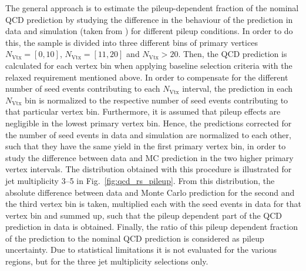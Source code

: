 The general approach is to estimate the pileup-dependent fraction of the nominal QCD prediction by studying the difference in the behaviour of the prediction in data and simulation (taken from \madgraph) for different pileup conditions. In order to do this, the sample is divided into three different bins of primary vertices $N_\mathrm{Vtx} = [0, 10]$, $N_\mathrm{Vtx} = [11, 20]$ and $N_\mathrm{Vtx} > 20$. Then, the QCD prediction is calculated for each vertex bin when applying baseline selection criteria with the relaxed \MHT requirement mentioned above. In order to compensate for the different number of seed events contributing to each $N_\mathrm{Vtx}$ interval, the prediction in each $N_\mathrm{Vtx}$ bin is normalized to the respective number of seed events contributing to that particular vertex bin. Furthermore, it is assumed that pileup effects are negligible in the lowest primary vertex bin. Hence, the predictions corrected for the number of seed events in data and simulation are normalized to each other, such that they have the same yield in the first primary vertex bin, in order to study the difference between data and MC prediction in the two higher primary vertex intervals. The distribution obtained with this procedure is illustrated for jet multiplicity 3--5 in Fig.~\ref{fig:qcd_rs_pileup}. 
From this distribution, the absolute difference between data and Monte Carlo prediction for the second and the third vertex bin is taken, multiplied each with the seed events in data for that vertex bin and summed up, such that the pileup dependent part of the QCD prediction in data is obtained.  %
Finally, the ratio of this pileup dependent fraction of the prediction to the nominal QCD prediction is considered as pileup uncertainty. Due to statistical limitations it is not evaluated for the various \HT regions, but for the three jet multiplicity selections only. 

